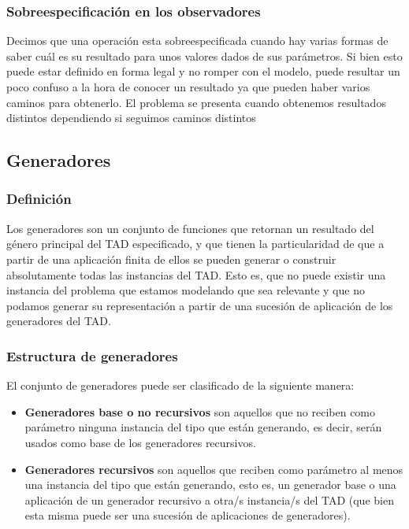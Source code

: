 \subsubsection*{Sobreespecificaci\'on en los observadores}
Decimos que una operaci\'on esta sobreespecificada cuando hay varias formas de saber cu\'al es su resultado para unos valores dados de sus par\'ametros. Si bien esto puede estar definido en forma legal y no romper con el modelo, puede resultar un poco confuso a la hora de conocer un resultado ya que pueden haber varios caminos para obtenerlo. El problema se presenta cuando obtenemos resultados distintos dependiendo si seguimos caminos distintos

\newpage

\subsection{Generadores}

\subsubsection*{Definici\'on}
Los generadores son un conjunto de funciones que retornan un resultado del g\'enero principal del TAD especificado, y que tienen la particularidad de que a partir de una aplicaci\'on finita de ellos se pueden generar o construir absolutamente todas las instancias del TAD. Esto es, que no puede existir una instancia del problema que estamos modelando que sea relevante y que no podamos generar su representaci\'on a partir de una sucesi\'on de aplicaci\'on de los generadores del TAD.

\subsubsection*{Estructura de generadores}
El conjunto de generadores puede ser clasificado de la siguiente manera:

\begin{itemize}
 \item \textbf{Generadores base o no recursivos} son aquellos que no reciben como par\'ametro ninguna instancia del tipo que est\'an generando, es decir, ser\'an usados como base de los generadores recursivos.
 \item \textbf{Generadores recursivos} son aquellos que reciben como par\'ametro al menos una instancia del tipo que est\'an generando, esto es, un generador base o una aplicaci\'on de un generador recursivo a otra/s instancia/s del TAD (que bien esta misma puede ser una sucesi\'on de aplicaciones de generadores).
\end{itemize}

